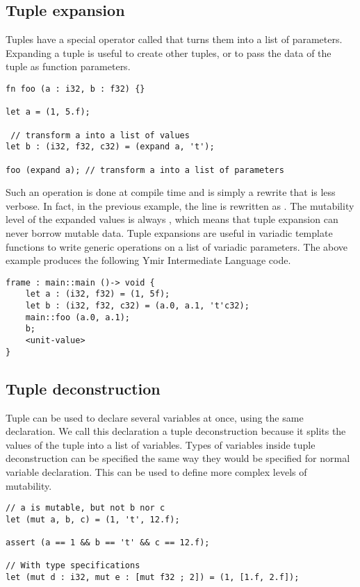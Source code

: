 \subsection {Tuple expansion}

Tuples have a special operator called  that turns them into a
list of parameters. Expanding a tuple is useful to create other tuples, or to
pass the data of the tuple as function parameters.

\begin{lstlisting}[style=coloredverbatim]
fn foo (a : i32, b : f32) {}

let a = (1, 5.f);

 // transform a into a list of values
let b : (i32, f32, c32) = (expand a, 't');

foo (expand a); // transform a into a list of parameters
\end{lstlisting}

Such an operation is done at compile time and is simply a rewrite that is less
verbose. In fact, in the previous example, the line  is
rewritten as . The mutability level of the expanded
values is always , which means that tuple expansion can never borrow
mutable data. Tuple expansions are useful in variadic template functions to
write generic operations on a list of variadic parameters. The above example produces the following Ymir Intermediate Language code.

\begin{lstlisting}[style=intermediateVerb]
frame : main::main ()-> void {
    let a : (i32, f32) = (1, 5f);
    let b : (i32, f32, c32) = (a.0, a.1, 't'c32);
    main::foo (a.0, a.1);
    b;
    <unit-value>
}
\end{lstlisting}

\subsection {Tuple deconstruction}

Tuple can be used to declare several variables at once, using the same
 declaration. We call this declaration a tuple deconstruction
because it splits the values of the tuple into a list of variables. Types of
variables inside tuple deconstruction can be specified the same way they would
be specified for normal variable declaration. This can be used to define more
complex levels of mutability.

\begin{lstlisting}[style=coloredverbatim]
  // a is mutable, but not b nor c
let (mut a, b, c) = (1, 't', 12.f);

assert (a == 1 && b == 't' && c == 12.f);

// With type specifications
let (mut d : i32, mut e : [mut f32 ; 2]) = (1, [1.f, 2.f]);
\end{lstlisting}

